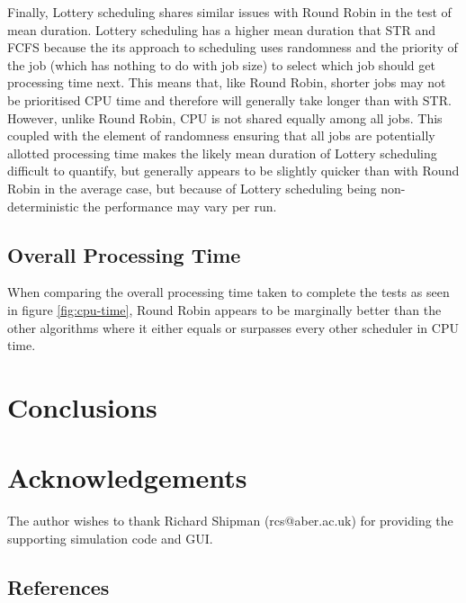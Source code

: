 \documentclass{acm_proc_article-sp}
\begin{document}
Finally, Lottery scheduling shares similar issues with Round Robin in the test of mean duration. Lottery scheduling has a higher mean duration that STR and FCFS because the its approach to scheduling uses randomness and the priority of the job (which has nothing to do with job size) to select which job should get processing time next. This means that, like Round Robin, shorter jobs may not be prioritised CPU time and therefore will generally take longer than with STR. However, unlike Round Robin, CPU is not shared equally among all jobs. This coupled with the element of randomness ensuring that all jobs are potentially allotted processing time makes the likely mean duration of Lottery scheduling difficult to quantify, but generally appears to be slightly quicker than with Round Robin in the average case, but because of Lottery scheduling being non-deterministic the performance may vary per run.

\subsection{Overall Processing Time}
When comparing the overall processing time taken to complete the tests as seen in figure \ref{fig:cpu-time}, Round Robin appears to be marginally better than the other algorithms where it either equals or surpasses every other scheduler in CPU time. 

\section{Conclusions}

\section{Acknowledgements}
The author wishes to thank Richard Shipman (rcs@aber.ac.uk) for providing the supporting simulation code and GUI.


\appendix
\subsection{References}
\balancecolumns
\end{document}
